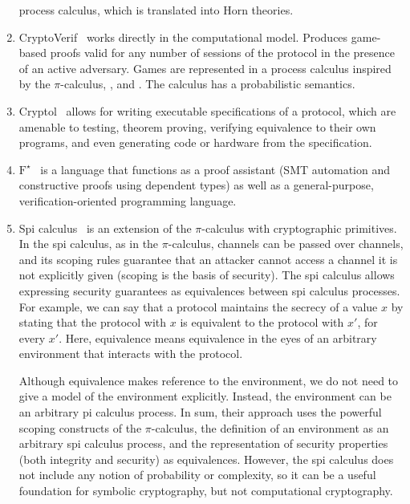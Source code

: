\begin{enumerate}[leftmargin=*]
    process calculus, which is translated into Horn theories.
  \item CryptoVerif~\cite{blanchet2007cryptoverif} works directly in the
    computational model. Produces game-based proofs valid for any number of
    sessions of the protocol in the presence of an active adversary. Games are
    represented in a process calculus inspired by the $\pi$-calculus,
    \cite{laud2005secrecy}, and \cite{mitchell2006probabilistic}. The calculus
    has a probabilistic semantics.
  \item Cryptol~\cite{lewis2003cryptol} allows for writing executable
    specifications of a protocol, which are amenable to testing, theorem
    proving, verifying equivalence to their own programs, and even generating
    code or hardware from the specification.
  \item $\text{F}^{\star}$~\cite{swamy2016dependent} is a language that functions as
    a proof assistant (SMT automation and constructive proofs using dependent
    types) as well as a general-purpose, verification-oriented programming
    language.
  \item Spi calculus~\cite{abadi1999calculus} is an extension of the
    $\pi$-calculus with cryptographic primitives. In the spi calculus, as in the
    $\pi$-calculus, channels can be passed over channels, and its scoping rules
    guarantee that an attacker cannot access a channel it is not explicitly
    given (scoping is the basis of security). The spi calculus allows expressing
    security guarantees as equivalences between spi calculus processes. For
    example, we can say that a protocol maintains the secrecy of a value $x$ by
    stating that the protocol with $x$ is equivalent to the protocol with $x'$,
    for every $x'$. Here, equivalence means equivalence in the eyes of an
    arbitrary environment that interacts with the protocol. 

    Although equivalence makes reference to the environment, we do not need to
    give a model of the environment explicitly. Instead, the environment can be
    an arbitrary pi calculus process. In sum, their approach uses the powerful
    scoping constructs of the $\pi$-calculus, the definition of an environment as
    an arbitrary spi calculus process, and the representation of security
    properties (both integrity and security) as equivalences. However, the spi
    calculus does not include any notion of probability or complexity, so it can
    be a useful foundation for symbolic cryptography, but not computational
    cryptography.


\end{enumerate}
